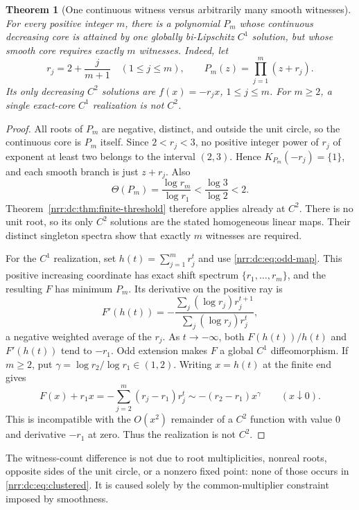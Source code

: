 \documentclass[11pt,letterpaper]{article}
\newtheorem{theorem}{Theorem}[section]
\theoremstyle{definition}
\theoremstyle{remark}
\begin{document}
\begin{theorem}[One continuous witness versus arbitrarily many smooth witnesses]
\label{nrr:dc:thm:witness-growth}
For every positive integer $m$, there is a polynomial $P_m$ whose
continuous decreasing core is attained by one globally bi-Lipschitz
$C^1$ solution, but whose smooth core requires exactly $m$ witnesses.
Indeed, let
\begin{equation}
 r_j=2+\frac{j}{m+1}\quad(1\le j\le m),\qquad
 P_m(z)=\prod_{j=1}^m(z+r_j).
 \label{nrr:dc:eq:clustered}
\end{equation}
Its only decreasing $C^2$ solutions are $f(x)=-r_jx$, $1\le j\le m$.
For $m\ge2$, a single exact-core $C^1$ realization is not $C^2$.
\end{theorem}
\begin{proof}
All roots of $P_m$ are negative, distinct, and outside the unit circle,
so the continuous core is $P_m$ itself. Since $2<r_j<3$, no positive
integer power of $r_j$ of exponent at least two belongs to the interval
$(2,3)$. Hence $K_{P_m}(-r_j)=\{1\}$, and each smooth branch is just
$z+r_j$. Also
\[
 \Theta(P_m)=\frac{\log r_m}{\log r_1}<\frac{\log3}{\log2}<2.
\]
Theorem~\ref{nrr:dc:thm:finite-threshold} therefore applies already at $C^2$.
There is no unit root, so its only $C^2$ solutions are the stated
homogeneous linear maps. Their distinct singleton spectra show that
exactly $m$ witnesses are required.

For the $C^1$ realization, set $h(t)=\sum_{j=1}^m r_j^t$ and use
\eqref{nrr:dc:eq:odd-map}. This positive increasing coordinate has exact
shift spectrum $\{r_1,\ldots,r_m\}$, and the resulting $F$ has minimum
$P_m$. Its derivative on the positive ray is
\[
 F'(h(t))=-\frac{\sum_j(\log r_j)r_j^{t+1}}
                    {\sum_j(\log r_j)r_j^t},
\]
a negative weighted average of the $r_j$. As $t\to-\infty$, both
$F(h(t))/h(t)$ and $F'(h(t))$ tend to $-r_1$. Odd extension makes
$F$ a global $C^1$ diffeomorphism.
If $m\ge2$, put $\gamma=\log r_2/\log r_1\in(1,2)$.
Writing $x=h(t)$ at the finite end gives
\[
 F(x)+r_1x
 =-\sum_{j=2}^m(r_j-r_1)r_j^t
 \sim -(r_2-r_1)x^\gamma\qquad(x\downarrow0).
\]
This is incompatible with the $O(x^2)$ remainder of a $C^2$ function
with value $0$ and derivative $-r_1$ at zero. Thus the realization
is not $C^2$.
\end{proof}

The witness-count difference is not due to root multiplicities,
nonreal roots, opposite sides of the unit circle, or a nonzero fixed
point: none of those occurs in \eqref{nrr:dc:eq:clustered}. It is caused
solely by the common-multiplier constraint imposed by smoothness.
\end{document}
